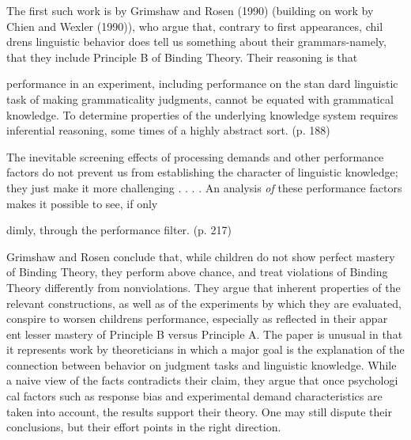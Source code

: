 \begin{styleTextbody}
The first such work is by Grimshaw and Rosen (1990) (building on work by Chien and Wexler (1990)), who argue that, contrary to first appearances, chil\- dren{\textquotesingle}s linguistic behavior does tell us something about their grammars-namely, that they include Principle B of Binding Theory. Their reasoning is that
\end{styleTextbody}


\begin{styleTextbody}
performance in an experiment, including performance on the stan\- dard linguistic task of making grammaticality judgments, cannot be equated with grammatical knowledge. To determine properties of the underlying knowledge system requires inferential reasoning, some\- times of a highly abstract sort. (p. 188)
\end{styleTextbody}


\begin{styleTextbody}
The inevitable screening effects of processing demands and other performance factors do not prevent us from establishing the character of linguistic knowledge; they just make it more challenging . . . . An analysis \textit{of}\textit{ }these performance factors makes it possible to see, if only
\end{styleTextbody}


\begin{styleTextbody}
dimly, through the performance filter. (p. 217)
\end{styleTextbody}


\begin{styleTextbody}
Grimshaw and Rosen conclude that, while children do not show perfect mastery of Binding Theory, they perform above chance, and treat violations of Binding Theory differently from nonviolations. They argue that inherent properties of the relevant constructions, as well as of the experiments by which they are evaluated, conspire to worsen children{\textquotesingle}s performance, especially as reflected in their appar\- ent lesser mastery of Principle B versus Principle A. The paper is unusual in that it represents work by theoreticians in which a major goal is the explanation of the connection between behavior on judgment tasks and linguistic knowledge. While a naive view of the facts contradicts their claim, they argue that once psychologi\- cal factors such as response bias and experimental demand characteristics are taken into account, the results support their theory. One may still dispute their conclusions, but their effort points in the right direction.
\end{styleTextbody}


